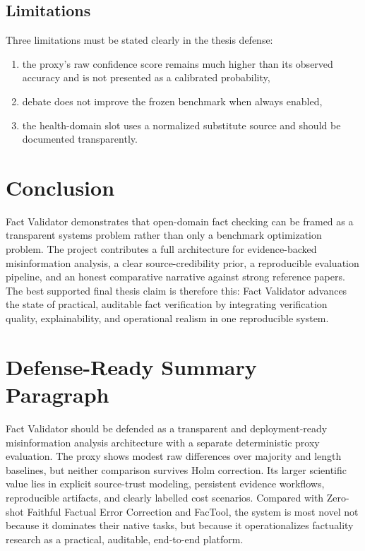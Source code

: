 \documentclass[12pt,a4paper,openright]{report}
\begin{document}
\section{Limitations}

Three limitations must be stated clearly in the thesis defense:

\begin{enumerate}
  \item the proxy's raw confidence score remains much higher than its observed accuracy and is not presented as a calibrated probability,
  \item debate does not improve the frozen benchmark when always enabled,
  \item the health-domain slot uses a normalized substitute source and should be documented transparently.
\end{enumerate}

\chapter{Conclusion}

Fact Validator demonstrates that open-domain fact checking can be framed as a transparent systems problem rather than only a benchmark optimization problem. The project contributes a full architecture for evidence-backed misinformation analysis, a clear source-credibility prior, a reproducible evaluation pipeline, and an honest comparative narrative against strong reference papers. The best supported final thesis claim is therefore this: Fact Validator advances the state of practical, auditable fact verification by integrating verification quality, explainability, and operational realism in one reproducible system.

\appendix

\chapter{Defense-Ready Summary Paragraph}

Fact Validator should be defended as a transparent and deployment-ready misinformation analysis architecture with a separate deterministic proxy evaluation. The proxy shows modest raw differences over majority and length baselines, but neither comparison survives Holm correction. Its larger scientific value lies in explicit source-trust modeling, persistent evidence workflows, reproducible artifacts, and clearly labelled cost scenarios. Compared with Zero-shot Faithful Factual Error Correction and FacTool, the system is most novel not because it dominates their native tasks, but because it operationalizes factuality research as a practical, auditable, end-to-end platform.
\end{document}
